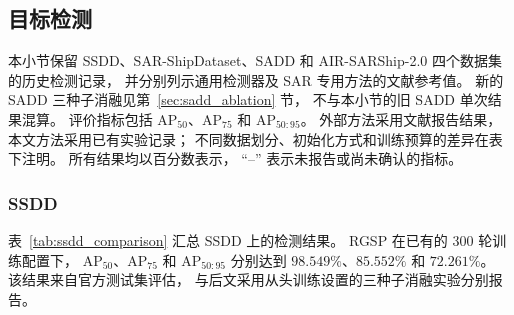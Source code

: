 \documentclass[journal]{IEEEtran}
\begin{document}
\subsection{目标检测}
\label{sec:detection_results}

本小节保留 SSDD、SAR-ShipDataset、SADD 和 AIR-SARShip-2.0
四个数据集的历史检测记录，
并分别列示通用检测器及 SAR 专用方法的文献参考值。
新的 SADD 三种子消融见第~\ref{sec:sadd_ablation} 节，
不与本小节的旧 SADD 单次结果混算。
评价指标包括 AP$_{50}$、AP$_{75}$ 和 AP$_{50:95}$。
外部方法采用文献报告结果，
本文方法采用已有实验记录；
不同数据划分、初始化方式和训练预算的差异在表下注明。
所有结果均以百分数表示，
``--'' 表示未报告或尚未确认的指标。

\subsubsection{SSDD}
\label{sec:ssdd_results}

表~\ref{tab:ssdd_comparison}
汇总 SSDD 上的检测结果。
RGSP 在已有的 300 轮训练配置下，
AP$_{50}$、AP$_{75}$ 和 AP$_{50:95}$
分别达到 $98.549\%$、$85.552\%$ 和 $72.261\%$。
该结果来自官方测试集评估，
与后文采用从头训练设置的三种子消融实验分别报告。
\end{document}
